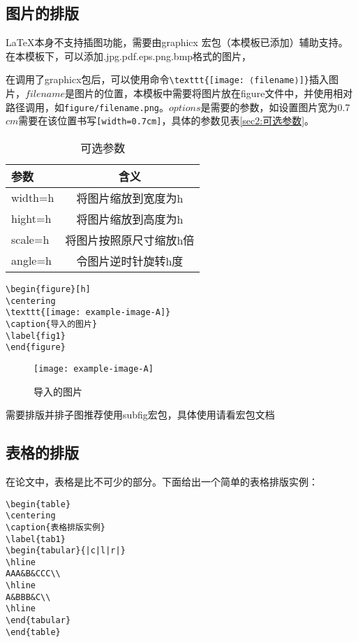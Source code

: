 \subsection{图片的排版}
\LaTeX 本身不支持插图功能，需要由graphicx 宏包（本模板已添加）辅助支持。在本模板下，可以添加.jpg.pdf.eps.png.bmp格式的图片，

在调用了graphicx包后，可以使用命令\verb|\texttt{[image: ⟨filename⟩]}|插入图片，$filename$是图片的位置，本模板中需要将图片放在figure文件中，并使用相对路径调用，如\verb|figure/filename.png|。$options$是需要的参数，如设置图片宽为0.7$cm$需要在该位置书写\verb|[width=0.7cm]|，具体的参数见表\ref{sec2:可选参数}。
\begin{table}[h]
\centering
\caption{可选参数}
\label{sec2:可选参数}
\begin{tabular}{lc}
\hline
参数&含义\\
\hline
width=h&将图片缩放到宽度为h\\
hight=h&将图片缩放到高度为h\\
scale=h&将图片按照原尺寸缩放h倍\\
angle=h&令图片逆时针旋转h度\\
\hline
\end{tabular}
\label{table1}
\end{table}

\begin{verbatim}
\begin{figure}[h]
\centering
\texttt{[image: example-image-A]}
\caption{导入的图片}
\label{fig1}
\end{figure}
\end{verbatim}
\begin{figure}[h]
\centering
\texttt{[image: example-image-A]}
\caption{导入的图片}
\label{fig1}
\end{figure}
需要排版并排子图推荐使用subfig宏包，具体使用请看宏包文档
\subsection{表格的排版}
在论文中，表格是比不可少的部分。下面给出一个简单的表格排版实例：
\begin{verbatim}
\begin{table}
\centering
\caption{表格排版实例}
\label{tab1}
\begin{tabular}{|c|l|r|}
\hline
AAA&B&CCC\\
\hline
A&BBB&C\\
\hline
\end{tabular}
\end{table}
\end{verbatim}

